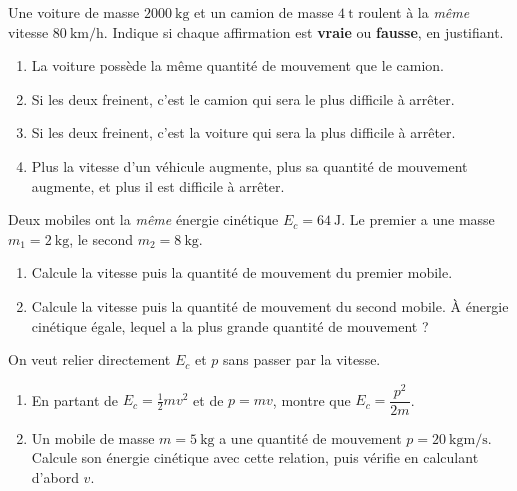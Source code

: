 \documentclass[11pt,a4paper]{article}
\begin{document}

\begin{exo}
Une voiture de masse $\qty{2000}{\kilogram}$ et un camion de masse $\qty{4}{\tonne}$ roulent à la
\emph{même} vitesse $\qty{80}{\kilo\metre\per\hour}$. Indique si chaque affirmation est \textbf{vraie}
ou \textbf{fausse}, en justifiant.
\begin{enumerate}[label=\alph*)]
  \item La voiture possède la même quantité de mouvement que le camion.
  \item Si les deux freinent, c'est le camion qui sera le plus difficile à arrêter.
  \item Si les deux freinent, c'est la voiture qui sera la plus difficile à arrêter.
  \item Plus la vitesse d'un véhicule augmente, plus sa quantité de mouvement augmente, et plus il est
        difficile à arrêter.
\end{enumerate}
\end{exo}

\begin{exo}
Deux mobiles ont la \emph{même} énergie cinétique $E_c=\qty{64}{\joule}$. Le premier a une masse
$m_1=\qty{2}{\kilogram}$, le second $m_2=\qty{8}{\kilogram}$.
\begin{enumerate}[label=\alph*)]
  \item Calcule la vitesse puis la quantité de mouvement du premier mobile.
  \item Calcule la vitesse puis la quantité de mouvement du second mobile. À énergie cinétique égale,
        lequel a la plus grande quantité de mouvement ?
\end{enumerate}
\end{exo}

\begin{exo}
On veut relier directement $E_c$ et $p$ sans passer par la vitesse.
\begin{enumerate}[label=\alph*)]
  \item En partant de $E_c=\tfrac12 m v^2$ et de $p=m v$, montre que $E_c=\dfrac{p^2}{2m}$.
  \item Un mobile de masse $m=\qty{5}{\kilogram}$ a une quantité de mouvement
        $p=\qty{20}{\kilogram\metre\per\second}$. Calcule son énergie cinétique avec cette relation,
        puis vérifie en calculant d'abord $v$.
\end{enumerate}
\end{exo}
\end{document}

